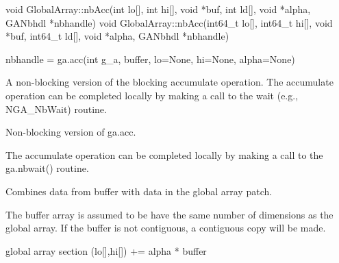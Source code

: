 \documentclass[10pt]{article}
\begin{document}
\begin{cxxapi}
\begin{cxxcode}
void GlobalArray::nbAcc(int lo[], int hi[],
        void *buf, int ld[], void *alpha, GANbhdl *nbhandle)
void GlobalArray::nbAcc(int64_t lo[], int64_t hi[],
        void *buf, int64_t ld[], void *alpha, GANbhdl *nbhandle)
\end{cxxcode}
\begin{funcargs}
\end{funcargs}
\end{cxxapi}

\begin{pyapi}
\begin{pycode}
nbhandle = ga.acc(int g_a, buffer, lo=None, hi=None, alpha=None)
\end{pycode}
\begin{funcargs}
\end{funcargs}
\end{pyapi}

\ncoll

\begin{desc}
A non-blocking version of the blocking accumulate operation. The accumulate
operation can be completed locally by making a call to the wait (e.g.,
NGA_NbWait) routine.

Non-blocking version of ga.acc.

The accumulate operation can be completed locally by making a call to the
ga.nbwait() routine.

Combines data from buffer with data in the global array patch.

The buffer array is assumed to be have the same number of dimensions as the global array. If the buffer is not contiguous, a contiguous copy will be made.

global array section (lo[],hi[]) += alpha * buffer
\end{desc}
\end{document}
